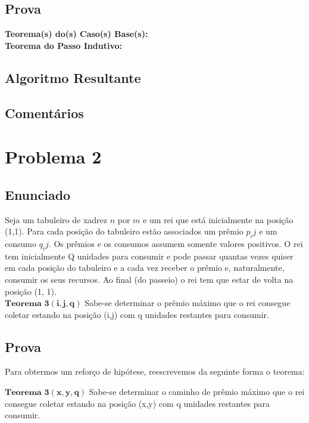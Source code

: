 \documentclass[twoside]{article}
\begin{document}
\begin{multicols}{2}
\subsection{ Prova }
\indent 
\textbf{Teorema(s) do(s) Caso(s) Base(s):}\\
\textbf{Teorema do Passo Indutivo:}\\
\subsection{ Algoritmo Resultante }
\subsection{ Comentários }

\newpage
\section{Problema 2}

\subsection{ Enunciado }
\indent Seja um tabuleiro de xadrez $n$ por $m$ e um rei que está inicialmente na posição (1,1). Para cada posição do tabuleiro estão associados um prêmio $p_ij$ e um consumo $q_ij$. Os prêmios e os consumos assumem somente valores positivos.
O rei tem inicialmente Q unidades para consumir e pode passar quantas vezes quiser em cada
posição do tabuleiro e a cada vez receber o prêmio e, naturalmente, consumir os seus recursos. Ao final (do passeio) o rei tem que estar de volta na posição (1, 1).\\

$\mathbf{Teorema}$ $\mathbf{3}$$\mathbf{(i,j,q)}$ Sabe-se determinar o prêmio máximo que o rei consegue coletar estando na posição (i,j) com q unidades restantes para consumir.\\

\subsection{ Prova }
Para obtermos um reforço de hipótese, reescrevemos da seguinte forma o teorema:

$\mathbf{Teorema}$ $\mathbf{3}$$\mathbf{(x,y,q)}$ Sabe-se determinar o caminho de prêmio máximo que o rei consegue coletar estando na posição (x,y) com q unidades restantes para consumir.\\


\end{multicols}
\end{document}
